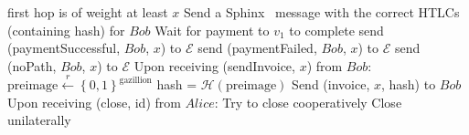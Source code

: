\begin{algorithmic}[1]
{      first hop is of weight at least $x$}
	\State Send a Sphinx~\cite{sphinx} message with the correct HTLCs (containing
	hash) for $Bob$
	\State {}
        \State Wait for payment to $v_1$ to complete
          \State send (paymentSuccessful, $Bob$, $x$) to $\mathcal{E}$
        \Else
          \State send (paymentFailed, $Bob$, $x$) to $\mathcal{E}$
        \EndIf
      \Else
        \State send (noPath, $Bob$, $x$) to $\mathcal{E}$
      \EndIf
    \State
    \State Upon receiving (sendInvoice, $x$) from $Bob$:
      \State $\mathrm{preimage} \overset{r}{\leftarrow}
      \left\{0,1\right\}^{\mathrm{gazillion}}$
      \State hash = $\mathcal{H}\left(\mathrm{preimage}\right)$
      \State Send (invoice, $x$, hash) to $Bob$
    \State
    \State Upon receiving (close, id) from $Alice$:
        \State Try to close cooperatively 
         
          \State Close unilaterally 
        \EndIf
      \EndIf
  \end{algorithmic}
\hrulefill
